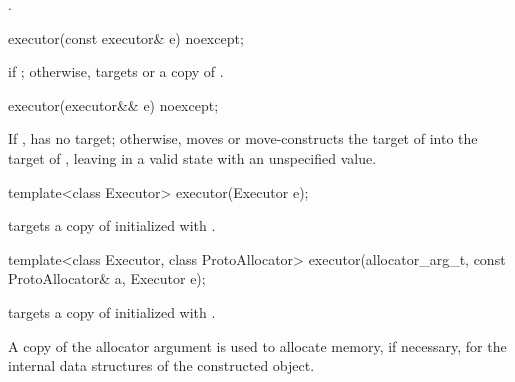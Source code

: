 \begin{itemdescr}
\pnum
\postconditions {}.
\end{itemdescr}

%
\begin{itemdecl}
executor(const executor& e) noexcept;
\end{itemdecl}

\begin{itemdescr}
\pnum
\postconditions {} if ; otherwise,  targets  or a copy of .
\end{itemdescr}

%
\begin{itemdecl}
executor(executor&& e) noexcept;
\end{itemdecl}

\begin{itemdescr}
\pnum
\effects If ,  has no target; otherwise, moves  or move-constructs the target of  into the target of , leaving  in a valid state with an unspecified value.
\end{itemdescr}

%
\begin{itemdecl}
template<class Executor> executor(Executor e);
\end{itemdecl}

\begin{itemdescr}
\pnum
\effects {} targets a copy of  initialized with .
\end{itemdescr}

%
\begin{itemdecl}
template<class Executor, class ProtoAllocator>
  executor(allocator_arg_t, const ProtoAllocator& a, Executor e);
\end{itemdecl}

\begin{itemdescr}
\pnum
\effects {} targets a copy of  initialized with .

\pnum
A copy of the allocator argument is used to allocate memory, if necessary, for the internal data structures of the constructed  object.
\end{itemdescr}



